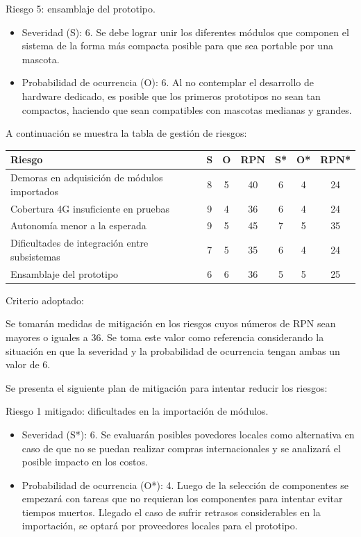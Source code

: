 \documentclass[
11pt, %
]{charter}
\begin{document}
Riesgo 5: ensamblaje del prototipo.
\begin{itemize}
	\item Severidad (S): 6. Se debe lograr unir los diferentes módulos que componen el sistema de la forma más compacta posible para que sea portable por una mascota.
	\item Probabilidad de ocurrencia (O): 6. Al no contemplar el desarrollo de hardware dedicado, es posible que los primeros prototipos no sean tan compactos, haciendo que sean compatibles con mascotas medianas y grandes.
\end{itemize}

A continuación se muestra la tabla de gestión de riesgos:

\begin{table}[htpb]
\centering
\begin{tabularx}{\linewidth}{@{}|X|c|c|c|c|c|c|@{}}
\hline
\rowcolor[HTML]{C0C0C0}
Riesgo & S & O & RPN & S* & O* & RPN* \\ \hline
Demoras en adquisición de módulos importados & 8 & 5 & 40 & 6 & 4 & 24 \\ \hline
Cobertura 4G insuficiente en pruebas & 9 & 4 & 36 & 6 & 4 & 24 \\ \hline
Autonomía menor a la esperada & 9 & 5 & 45 & 7 & 5 & 35 \\ \hline
Dificultades de integración entre subsistemas & 7 & 5 & 35 & 6 & 4 & 24 \\ \hline
Ensamblaje del prototipo & 6 & 6 & 36 & 5 & 5 & 25 \\ \hline
\end{tabularx}
\end{table}

Criterio adoptado:

Se tomarán medidas de mitigación en los riesgos cuyos números de RPN sean mayores o iguales a 36. Se toma este valor como referencia considerando la situación en que la severidad y la probabilidad de ocurrencia tengan ambas un valor de 6.

Se presenta el siguiente plan de mitigación para intentar reducir los riesgos:

Riesgo 1 mitigado: dificultades en la importación de módulos.
\begin{itemize}
	\item Severidad (S*): 6. Se evaluarán posibles povedores locales como alternativa en caso de que no se puedan realizar compras internacionales y se analizará el posible impacto en los costos.
	\item Probabilidad de ocurrencia (O*): 4. Luego de la selección de componentes se empezará con tareas que no requieran los componentes para intentar evitar tiempos muertos. Llegado el caso de sufrir retrasos considerables en la importación, se optará por proveedores locales para el prototipo.
\end{itemize}
\end{document}
